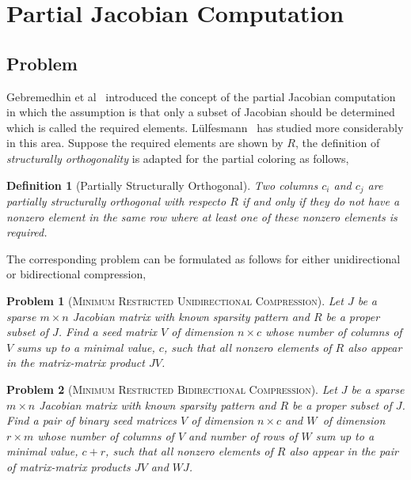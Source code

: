 \documentclass[12pt, oneside]{book}
\newtheorem{problem}{Problem}
\newtheorem{definition}{Definition}
\newcommand{\col}{\ensuremath{c}}
\newcommand{\row}{\ensuremath{r}}
\newcommand{\MinStaBic}{\textsc{Minimum Star Bicoloring}}
\newcommand{\MinBidCom}{\textsc{Minimum Bidirectional Compression}}
\newcommand{\MinRUniCom}{\textsc{Minimum Restricted Unidirectional Compression}}
\newcommand{\MinRBidCom}{\textsc{Minimum Restricted Bidirectional Compression}}
\begin{document}

\section{Partial Jacobian Computation}
\label{s.part.jac}
\subsection{Problem}
Gebremedhin et al~\cite{Gebremedhin05whatcolor} introduced the concept of the partial Jacobian computation
in which the assumption is that only a subset of Jacobian should be determined which is called the required elements. 
L{\"u}lfesmann~\cite{Lulfesmann2012Fap} has studied more considerably in this area.
Suppose the required elements are shown by $R$, the definition of
\emph{structurally orthogonality} is adapted for the partial coloring as follows,
\begin{definition}[Partially Structurally Orthogonal]\label{d.part.str.orth}
Two columns $c_i$ and $c_j$ are partially structurally orthogonal with respecto $R$ 
if and only if they do not have a nonzero element in the same row where at least 
one of these nonzero elements is required.
\end{definition}

The corresponding problem can be formulated as follows for either unidirectional
or bidirectional compression,
\begin{problem}[\MinRUniCom]
\label{p.seed.runi} Let $J$ be a sparse ${m\times n}$ Jacobian matrix with known sparsity
pattern and $R$ be a proper subset of $J$. Find a seed matrix $V$ of dimension $n\times \col$ 
whose number of columns of $V$ sums up
to a minimal value, $\col$, such that all nonzero elements of $R$ also appear in
the matrix-matrix product $JV$.
\end{problem}

\begin{problem}[\MinRBidCom]
\label{p.seed.rbid} Let $J$ be a sparse ${m\times n}$ Jacobian matrix with known sparsity
pattern and $R$ be a proper subset of $J$. 
Find a pair of binary seed matrices $V$ of dimension $n\times \col$ and $W$~of
dimension $\row \times m$ whose number of columns of $V$ and number of rows of $W$ sum up
to a minimal value, $\col + \row$, such that all nonzero elements of $R$ also appear in
the pair of matrix-matrix products $JV$ and $WJ$.
\end{problem}
\end{document}
